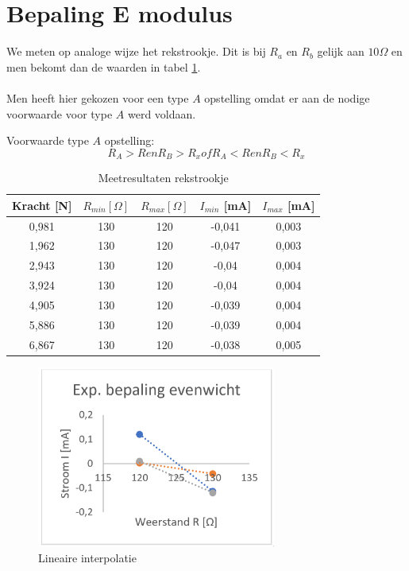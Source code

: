 \section{Bepaling E modulus}

We meten op analoge wijze het rekstrookje.
Dit is bij $R_a$ en $R_b$ gelijk aan $10\Omega$ en 
men bekomt dan de waarden in tabel \ref{tab:rekstrookje}.
\\ \\
Men heeft hier gekozen voor een type $A$ opstelling omdat
er aan de nodige voorwaarde voor type $A$ werd voldaan.

Voorwaarde type $A$ opstelling:
$$ R_A > R en R_B > R_x of R_A < R en R_B < R_x $$

\begin{table}[h]
    \centering
    \caption{Meetresultaten rekstrookje}
    \label{tab:rekstrookje}

    \begin{tabular}{| c | c | c | c | c |}
        \hline
        Kracht [N] & $R_{min} [\Omega]$& $R_{max} [\Omega]$& $I_{min}$ [mA] & $I_{max}$ [mA] \\ \hline
        0,981      & 130               & 120               & -0,041    & 0,003 \\ \hline
        1,962      & 130               & 120               &-0,047     & 0,003 \\ \hline
        2,943      & 130               & 120               &-0,04      & 0,004 \\ \hline
        3,924      & 130               & 120               &-0,04      & 0,004 \\ \hline
        4,905      & 130               & 120               &-0,039     & 0,004 \\ \hline
        5,886      & 130               & 120               &-0,039     & 0,004 \\ \hline
        6,867      & 130               & 120               &-0,038     & 0,005 \\ \hline
    \end{tabular}
\end{table}

\begin{figure}[h]
    \centering
    \caption{Lineaire interpolatie}
    \label{fig:lin_interpol_e}
    \includegraphics[width=0.7\textwidth]{img/tweede.png}
\end{figure}

